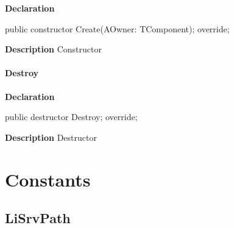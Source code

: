 \documentclass{report}
\newif\ifpdf
\begin{document}
\label{swcatalog.TCTLEntry-Create}
\begin{list}{}{
\setlength{\itemindent}{0cm}
\setlength{\listparindent}{0cm}
\setlength{\leftmargin}{\evensidemargin}
\addtolength{\leftmargin}{\tmplength}
\settowidth{\labelsep}{X}
\addtolength{\leftmargin}{\labelsep}
\setlength{\labelwidth}{\tmplength}
}
\item[\textbf{Declaration}\hfill]
\ifpdf
\begin{flushleft}
\fi
\begin{ttfamily}
public constructor Create(AOwner: TComponent); override;\end{ttfamily}

\ifpdf
\end{flushleft}
\fi

\par
\item[\textbf{Description}]
Constructor

\end{list}
\paragraph*{Destroy}\hspace*{\fill}

\label{swcatalog.TCTLEntry-Destroy}
\begin{list}{}{
\setlength{\itemindent}{0cm}
\setlength{\listparindent}{0cm}
\setlength{\leftmargin}{\evensidemargin}
\addtolength{\leftmargin}{\tmplength}
\settowidth{\labelsep}{X}
\addtolength{\leftmargin}{\labelsep}
\setlength{\labelwidth}{\tmplength}
}
\item[\textbf{Declaration}\hfill]
\ifpdf
\begin{flushleft}
\fi
\begin{ttfamily}
public destructor Destroy; override;\end{ttfamily}

\ifpdf
\end{flushleft}
\fi

\par
\item[\textbf{Description}]
Destructor

\end{list}
\section{Constants}
\ifpdf
\subsection*{\large{\textbf{LiSrvPath}}\normalsize\hspace{1ex}\hrulefill}
\else
\end{document}
